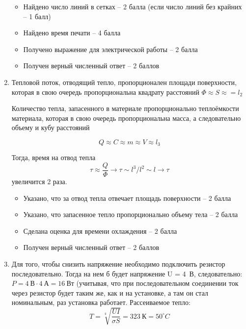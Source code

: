 \begin{enumerate}

    \markSection
    
    \begin{itemize}
        \item Найдено число линий в сетках  – 2 балла (если число линий без крайних – 1 балл)
        \item Найдено время печати – 4 балла
        \item Получено выражение для электрической работы – 2 балла
        \item Получен верный численный ответ – 2 баллов 
    \end{itemize}

    \item Тепловой поток, отводящий тепло, пропорционален площади поверхности, которая в свою очередь пропорциональна квадрату расстояний $\Phi \approx S \approx =l_2$
    
    Количество тепла, запасенного в материале пропорционально теплоёмкости материала, которая в свою очередь пропорциональна масса, а следовательно объему и кубу расстояний 

    $$Q \approx C \approx m \approx V \approx l_3$$
    
    Тогда, время на отвод тепла $$\tau \approx \frac{Q}{\Phi} \rightarrow \tau \sim  l^3/l^2 \sim l \rightarrow \tau$$ увеличится 2 раза.


    \markSection
    
    \begin{itemize}
        \item Указано, что за отвод тепла отвечает площадь поверхности – 2 балла 
        \item Указано, что запасенное тепло пропорционально объему тела – 2 балла
        \item Сделана оценка для времени охлаждения  – 2 балла
        \item Получен верный численный ответ – 2 баллов 
    \end{itemize}

    \item Для того, чтобы снизить напряжение необходимо подключить резистор последовательно. Тогда на нем б будет напряжение U = 4~В, следовательно: $P = 4 \: \text{В} \cdot 4 \: \text{А} = 16 \: \text{Вт}$ (учитывая, что при последовательном соединении ток через резистор будет таким же, как и на установке, а там он стал номинальным, раз установка работает. Рассеиваемое тепло:
    $$T=\sqrt[4]{\frac{UI}{\sigma S}}=323 \: \text{К}=50^\circ C$$


\end{enumerate}
